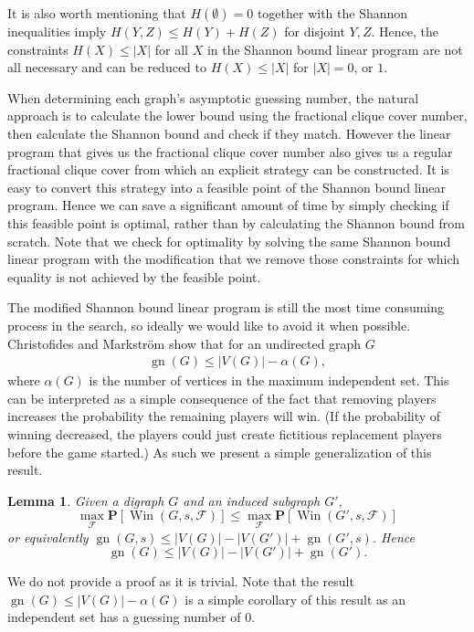 \documentclass[a4paper, 14pt]{extarticle}
\theoremstyle{plain}
\newtheorem{lemma}[proposition]{Lemma}
\def\mc{\mathcal}
\def\mb{\mathbf}
\DeclareMathOperator{\gn}{gn}
\DeclareMathOperator{\Win}{Win}
\begin{document}
It is also worth mentioning that $H(\emptyset)=0$ together with the
Shannon inequalities imply $H(Y,Z)\leq H(Y)+H(Z)$ for disjoint
$Y,Z$. Hence, the constraints $H(X)\leq |X|$ for all $X$ in the
Shannon bound linear program are not all necessary and can be
reduced to $H(X)\leq |X|$ for $|X|=0$, or $1$.


When determining each graph's asymptotic guessing number, the natural
approach is to calculate the lower bound using the fractional clique
cover number, then calculate the Shannon bound and check if they
match. However the linear program that gives us the fractional
clique cover number also gives us a regular fractional clique cover
from which an explicit strategy can be constructed. It is easy to
convert this strategy into a feasible point of the Shannon bound
linear program. Hence we can save a significant amount of time by
simply checking if this feasible point is optimal, rather than by
calculating the Shannon bound from scratch. Note that we check for
optimality by solving the same Shannon bound linear program with the
modification that we remove those constraints for which equality
is not achieved by the feasible point.

The modified Shannon bound linear program is still the most time
consuming process in the search, so ideally we would like to avoid
it when possible. Christofides and Markstr\"om \cite{Christofides&Markstrom11} show that for an
undirected graph $G$
\begin{align*}
\gn(G) \leq |V(G)|-\alpha(G),
\end{align*}
where $\alpha(G)$ is the number of vertices in the maximum
independent set. This can be interpreted as a simple consequence of
the fact that removing players increases the probability the
remaining players will win. (If the probability of winning
decreased, the players could just create fictitious replacement
players before the game started.) As such we present a simple
generalization of this result.

\begin{lemma}\label{Lem:RemoveVertices}
Given a digraph $G$ and an induced subgraph $G'$,
\[
\max_{\mc{F}}\mb{P}[\Win(G,s,\mc{F})]\leq
\max_{\mc{F}}\mb{P}[\Win(G',s,\mc{F})]
\]
or equivalently $\gn(G,s)\leq |V(G)|-|V(G')|+\gn(G',s)$. Hence
\[
\gn(G) \leq |V(G)|-|V(G')|+\gn(G').
\]
\end{lemma}

We do not provide a proof as it is trivial. Note that the result
$\gn(G)\leq |V(G)|-\alpha(G)$ is a simple corollary of this result
as an independent set has a guessing number of $0$.
\end{document}
